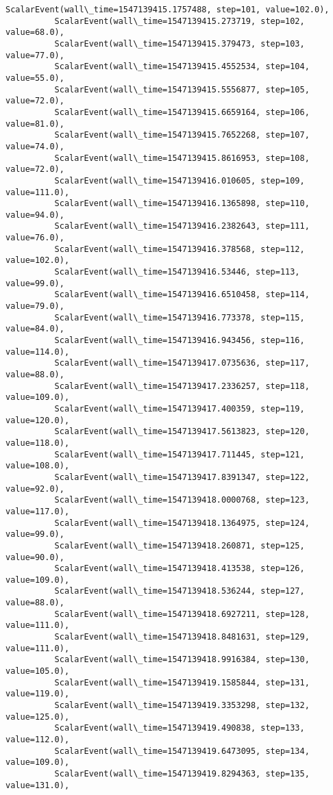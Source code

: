 \documentclass[11pt]{article}
\begin{document}
\begin{Verbatim}[commandchars=\\\{\}]
          ScalarEvent(wall\_time=1547139415.1757488, step=101, value=102.0),
          ScalarEvent(wall\_time=1547139415.273719, step=102, value=68.0),
          ScalarEvent(wall\_time=1547139415.379473, step=103, value=77.0),
          ScalarEvent(wall\_time=1547139415.4552534, step=104, value=55.0),
          ScalarEvent(wall\_time=1547139415.5556877, step=105, value=72.0),
          ScalarEvent(wall\_time=1547139415.6659164, step=106, value=81.0),
          ScalarEvent(wall\_time=1547139415.7652268, step=107, value=74.0),
          ScalarEvent(wall\_time=1547139415.8616953, step=108, value=72.0),
          ScalarEvent(wall\_time=1547139416.010605, step=109, value=111.0),
          ScalarEvent(wall\_time=1547139416.1365898, step=110, value=94.0),
          ScalarEvent(wall\_time=1547139416.2382643, step=111, value=76.0),
          ScalarEvent(wall\_time=1547139416.378568, step=112, value=102.0),
          ScalarEvent(wall\_time=1547139416.53446, step=113, value=99.0),
          ScalarEvent(wall\_time=1547139416.6510458, step=114, value=79.0),
          ScalarEvent(wall\_time=1547139416.773378, step=115, value=84.0),
          ScalarEvent(wall\_time=1547139416.943456, step=116, value=114.0),
          ScalarEvent(wall\_time=1547139417.0735636, step=117, value=88.0),
          ScalarEvent(wall\_time=1547139417.2336257, step=118, value=109.0),
          ScalarEvent(wall\_time=1547139417.400359, step=119, value=120.0),
          ScalarEvent(wall\_time=1547139417.5613823, step=120, value=118.0),
          ScalarEvent(wall\_time=1547139417.711445, step=121, value=108.0),
          ScalarEvent(wall\_time=1547139417.8391347, step=122, value=92.0),
          ScalarEvent(wall\_time=1547139418.0000768, step=123, value=117.0),
          ScalarEvent(wall\_time=1547139418.1364975, step=124, value=99.0),
          ScalarEvent(wall\_time=1547139418.260871, step=125, value=90.0),
          ScalarEvent(wall\_time=1547139418.413538, step=126, value=109.0),
          ScalarEvent(wall\_time=1547139418.536244, step=127, value=88.0),
          ScalarEvent(wall\_time=1547139418.6927211, step=128, value=111.0),
          ScalarEvent(wall\_time=1547139418.8481631, step=129, value=111.0),
          ScalarEvent(wall\_time=1547139418.9916384, step=130, value=105.0),
          ScalarEvent(wall\_time=1547139419.1585844, step=131, value=119.0),
          ScalarEvent(wall\_time=1547139419.3353298, step=132, value=125.0),
          ScalarEvent(wall\_time=1547139419.490838, step=133, value=112.0),
          ScalarEvent(wall\_time=1547139419.6473095, step=134, value=109.0),
          ScalarEvent(wall\_time=1547139419.8294363, step=135, value=131.0),

\end{Verbatim}
\end{document}
